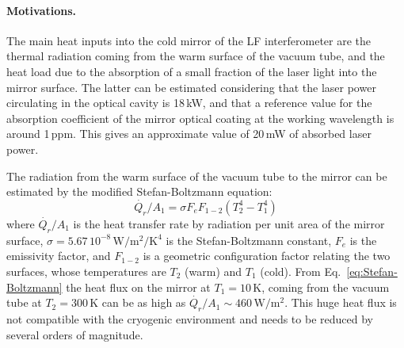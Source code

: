 \paragraph{Motivations.\newline}


The main heat inputs into the cold mirror of the LF interferometer are the thermal radiation coming from the warm surface of the vacuum tube, and the heat load due to the  absorption of a small fraction of the laser light into the mirror surface. The latter can be estimated considering that the laser power circulating in the optical cavity is 18\,kW, and that a reference value for the absorption coefficient of the mirror optical coating at the working wavelength is around 1\,ppm. This gives an approximate value of 20\,mW of absorbed laser power.

The radiation from the warm surface of the vacuum tube to the mirror can be estimated by the modified Stefan-Boltzmann equation:
\begin{equation}
\label{eq:Stefan-Boltzmann}
\dot{Q_r}/A_1 = \sigma F_e F_{1-2} (T_2^4 - T_1^4)
\end{equation}
where $\dot{Q_r}/A_1$ is the heat transfer rate by radiation per unit area of the mirror surface, $\sigma=5.67\,10^{-8}\, \mathrm{W/m^2/K^4}$ is the Stefan-Boltzmann constant, $F_e$ is the emissivity factor, and $F_{1-2}$ is a geometric configuration factor relating the two surfaces, whose temperatures are $T_2$ (warm) and $T_1$ (cold).  From Eq.~\ref{eq:Stefan-Boltzmann} the heat flux on the mirror at $T_1 = 10$\,K, coming from the vacuum tube at $T_2 = 300$\,K can be as high as $\dot{Q_r}/A_1\sim 460\,\mathrm{W/m^2}$. This huge heat flux is not compatible with the cryogenic environment and needs to be reduced by several orders of magnitude. 

